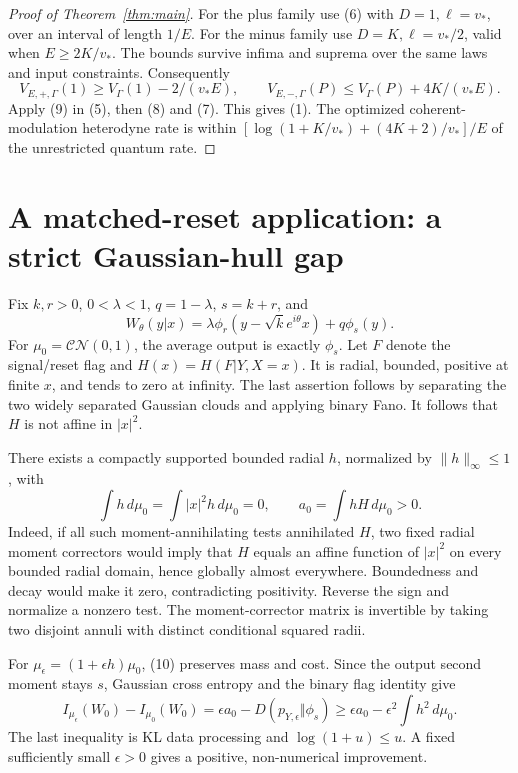 \documentclass[11pt]{article}
\newcommand{\CN}{\mathcal{CN}}
\begin{document}
\begin{proof}[Proof of Theorem~\ref{thm:main}]
For the plus family use (6) with \(D=1,\ell=v_*\), over an interval
of length \(1/E\). For the minus family use \(D=K,\ell=v_*/2\),
valid when \(E\geq2K/v_*\). The bounds survive infima and suprema over
the same laws and input constraints. Consequently
\[
 V_{E,+,\Gamma}(1)\geq V_\Gamma(1)-2/(v_*E),\qquad
 V_{E,-,\Gamma}(P)\leq V_\Gamma(P)+4K/(v_*E).
\]
Apply (9) in (5), then (8) and (7). This gives (1).
The optimized coherent-modulation heterodyne rate is within
\([\log(1+K/v_*)+(4K+2)/v_*]/E\) of the unrestricted quantum rate.
\end{proof}

\section{A matched-reset application: a strict Gaussian-hull gap}\label{sec:matched}

Fix \(k,r>0\), \(0<\lambda<1\), \(q=1-\lambda\), \(s=k+r\), and
\[
 W_\theta(y|x)=\lambda\phi_r(y-\sqrt k e^{i\theta}x)+q\phi_s(y).
\]
For \(\mu_0=\CN(0,1)\), the average output is exactly \(\phi_s\).
Let \(F\) denote the signal/reset flag and
\(H(x)=H(F|Y,X=x)\). It is radial, bounded, positive at finite \(x\),
and tends to zero at infinity. The last assertion follows by separating
the two widely separated Gaussian clouds and applying binary Fano.
It follows that \(H\) is not affine in \(|x|^2\).

There exists a compactly supported bounded radial \(h\), normalized by
\(\|h\|_\infty\leq1\), with
\[
 \int h\,d\mu_0=\int |x|^2h\,d\mu_0=0,\qquad
 a_0=\int hH\,d\mu_0>0.                                   \tag{10}
\]
Indeed, if all such moment-annihilating tests annihilated \(H\), two
fixed radial moment correctors would imply that \(H\) equals an affine
function of \(|x|^2\) on every bounded radial domain, hence globally
almost everywhere. Boundedness and decay would make it zero,
contradicting positivity. Reverse the sign and normalize a nonzero test.
The moment-corrector matrix is invertible by taking two disjoint annuli
with distinct conditional squared radii.

For \(\mu_\epsilon=(1+\epsilon h)\mu_0\), (10) preserves mass and cost.
Since the output second moment stays \(s\), Gaussian cross entropy and
the binary flag identity give
\[
 I_{\mu_\epsilon}(W_0)-I_{\mu_0}(W_0)
  =\epsilon a_0-D(p_{Y,\epsilon}\Vert\phi_s)
  \geq\epsilon a_0-\epsilon^2\int h^2\,d\mu_0.               \tag{11}
\]
The last inequality is KL data processing and
\(\log(1+u)\leq u\). A fixed sufficiently small \(\epsilon>0\)
gives a positive, non-numerical improvement.
\end{document}
